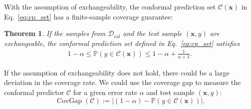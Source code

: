 \documentclass{article}
\renewcommand{\P}{\mathbb{P}}
\newcommand{\C}{\mathcal{C}}
\newcommand{\1}{\mathbbm{1}}
\newcommand{\Eqref}[1]{Eq.~\eqref{#1}}
\newcommand{\CovGap}{\mathop{\text{CovGap}}}
\newcommand{\of}[1]{\left(#1\right)}
\theoremstyle{plain}
\newtheorem{theorem}{Theorem}[section]
\theoremstyle{definition}
\theoremstyle{remark}
\begin{document}
With the assumption of exchangeability, the conformal prediction set \({\mathcal{C}}(\boldsymbol{x})\) in \Eqref{eq:cp_set} has a finite-sample coverage guarantee:
\begin{theorem}\citep{lei2018distributionfree, barber2023conformal}\label{prop:finite-sample_coverage_guarantee}
If the samples from $\mathcal{D}_{\text{cal}}$ and the test sample $(\boldsymbol{x},y)$ are exchangeable, the conformal prediction set defined in \Eqref{eq:cp_set} satisfies
\begin{align*}
1-\alpha\leq\P\of{y\in {\C}(\boldsymbol{x})}\leq1-\alpha+\frac{1}{n+1}.
\end{align*}
\end{theorem}
If the assumption of exchangeability does not hold, there could be a large deviation in the coverage rate.
We could use the coverage gap to measure the conformal predictor $\C$ for a given error rate $\alpha$ and test sample $(\boldsymbol{x}, y)$: 
\begin{equation*}
    \CovGap(\C) := |(1-\alpha) - \P(y \in \C(\boldsymbol{x}))|.
\end{equation*}
\end{document}
